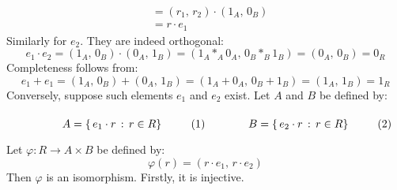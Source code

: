 \documentclass[crop=false,class=article]{standalone}                           %
\begin{document}
\begin{solution}
\begin{subequations}
\begin{align}
                    &=(r_{1},\,r_{2})\cdot(1_{A},\,0_{B})\\
                    &=r\cdot{e}_{1}
                \end{align}
            \end{subequations}
            Similarly for $e_{2}$. They are indeed orthogonal:
            \begin{equation}
                e_{1}\cdot{e}_{2}
                =(1_{A},\,0_{B})\cdot(0_{A},\,1_{B})
                =(1_{A}*_{A}0_{A},\,0_{B}*_{B}1_{B})
                =(0_{A},\,0_{B})
                =0_{R}
            \end{equation}
            Completeness follows from:
            \begin{equation}
                e_{1}+e_{1}
                =(1_{A},\,0_{B})+(0_{A},\,1_{B})
                =(1_{A}+0_{A},\,0_{B}+1_{B})
                =(1_{A},\,1_{B})
                =1_{R}
            \end{equation}
            Conversely, suppose such elements $e_{1}$ and $e_{2}$ exist.
            Let $A$ and $B$ be defined by:
            \par\hfill\par
            \begin{subequations}
                \begin{minipage}[b]{0.49\textwidth}
                    \begin{equation}
                        A=\{\,e_{1}\cdot{r}\,:\,r\in{R}\}
                    \end{equation}
                \end{minipage}
                \hfill
                \begin{minipage}[b]{0.49\textwidth}
                    \begin{equation}
                        B=\{\,e_{2}\cdot{r}\,:\,r\in{R}\}
                    \end{equation}
                \end{minipage}
            \end{subequations}
            \par\vspace{2.5ex}
            Let $\varphi:R\rightarrow{A}\times{B}$ be defined by:
            \begin{equation}
                \varphi(r)=(r\cdot{e}_{1},\,r\cdot{e}_{2})
            \end{equation}
            Then $\varphi$ is an isomorphism. Firstly, it is injective.

\end{solution}
\end{document}
